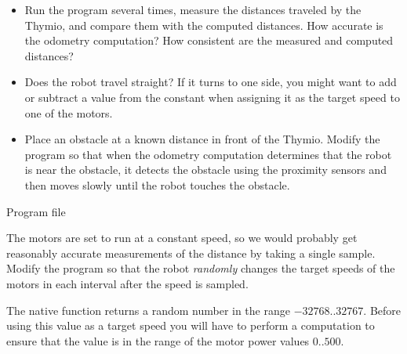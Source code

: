 
\begin{itemize}
\item Run the program several times, measure the distances traveled by the Thymio,
and compare them with the computed distances. How accurate is the odometry
computation? How consistent are the measured and computed distances?

\item Does the robot travel straight? If it turns to one side, you might want to
add or subtract a value from the constant  when assigning it as
the target speed to one of the motors.

\item Place an obstacle at a known distance in front of the Thymio.
Modify the program so that when the odometry computation determines
that the robot is near the obstacle, it detects the obstacle using
the proximity sensors and then moves slowly until the robot touches the obstacle.

\end{itemize}


{\raggedleft \hfill Program file }

The motors are set to run at a constant speed,
so we would probably get reasonably accurate measurements of the distance
by taking a single sample.
Modify the program so that the robot \emph{randomly} changes the target speeds
of the motors in each interval after the speed is sampled.

The native function  returns a random
number in the range $-32768..32767$. Before using this value as a target
speed you will have to perform a computation to ensure that the value is in
the range of the motor power values $0..500$.



